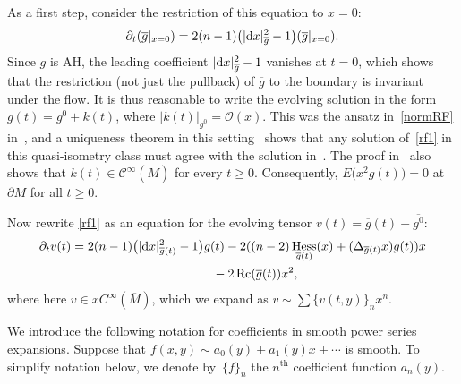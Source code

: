 \documentclass[pdftex]{sigma}
\numberwithin{equation}{section}
\newcommand{\del}{\partial}
\newcommand{\olg}{\overline{g}}
\newcommand{\olgin}{\overline{\gin}}
\newcommand{\olE}{\overline{E}}
\newcommand{\calO}{\mathcal O}
\newcommand{\calC}{\mathcal C}
\newcommand{\gin}{{g^0}}
\newcommand{\gbar}{\overline{g}}
\newcommand{\Mbar}{\overline{M}}
\DeclareMathOperator{\Rc}{Rc}
\DeclareMathOperator{\hess}{Hess}
\begin{document}
As a first step, consider the restriction of this equation to $x = 0$:
\begin{gather*}%
 \del_t (\olg |_{x=0} ) = 2(n-1) \big( |{\rm d}x|_{\olg}^2 - 1\big) (\olg |_{x=0} ) .
\end{gather*}
Since $g$ is AH, the leading coefficient $|{\rm d}x|^2_{\olg} - 1$ vanishes at $t=0$, which shows that the restriction (not just the
pullback) of $\olg$ to the boundary is invariant under the flow. It is thus reasonable to write the evolving solution
in the form $g(t) = \gin + k(t)$, where $|k(t)|_{\gin} = \calO(x)$. This was the ansatz in~\eqref{normRF} in~\cite{Bahuaud}, and
a uniqueness theorem in this setting~\cite{Chen-Zhu} shows that any solution of~\eqref{rf1} in this quasi-isometry class
must agree with the solution in~\cite{Bahuaud}. The proof in~\cite{Bahuaud} also shows that $k(t) \in \calC^\infty(\overline{M})$
for every $t \geq 0$. Consequently, $\olE\big( x^2 g(t)\big) = 0 $ at $\del M$ for all $t \geq 0$.

Now rewrite \eqref{rf1} as an equation for the evolving tensor $v(t) = \olg(t) - \olgin$:
\begin{gather}
 \del_t v(t) = 2 (n-1) \big(|{\rm d}x|^2_{\gbar(t)} -1\big) \olg(t) -2 ( (n-2) \hess_{\olg(t)} (x) + (\Delta_{\olg(t)} x) \olg(t) ) x\nonumber\\
\hphantom{\del_t v(t) =}{} -2 \Rc(\gbar(t)) x^2, \label{rf2}
\end{gather}
where here $v \in x C^{\infty}(\Mbar)$, which we expand as $v \sim \sum \{ v(t,y) \}_n x^n$.

We introduce the following notation for coefficients in smooth power series expansions. Suppose that $f(x,y) \sim a_0(y) + a_1(y) x + \cdots$ is smooth. To simplify notation below, we denote by~$\{f\}_{n}$ the $n^{\mathrm{th}}$ coefficient function $a_n(y)$.
\end{document}
